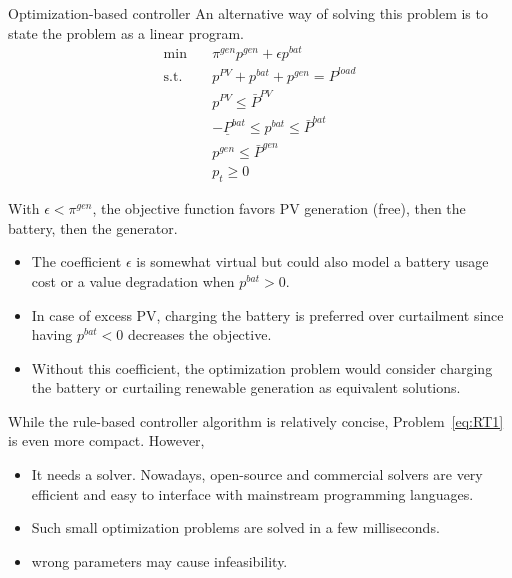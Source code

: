\begin{frame}[allowframebreaks]{Optimization-based controller}
An alternative way of solving this problem is to state the problem as a linear program. 
\begin{subequations}
	\label{eq:RT1}
    \begin{align}
    \min        \quad  & \pi^{gen} p^{gen}  + \epsilon p^{bat}\\
    \text{s.t.} \quad  & p^{PV}+p^{bat}+p^{gen} = P^{load} \\
                    & p^{PV} \leq \bar{P}^{PV} \\
                    & -\underline{P}^{bat} \leq p^{bat} \leq \bar{P}^{bat} \\
                    & p^{gen} \leq \bar{P}^{gen}\\
                    & p_t \geq 0
    \end{align}
\end{subequations}

With $\epsilon < \pi^{gen}$, the objective function favors PV generation (free), then the battery, then the generator. 

\begin{itemize}
    \item The coefficient $\epsilon$ is somewhat virtual but could also model a battery usage cost or a value degradation when $p^{bat} > 0$.
    \item In case of excess PV, charging the battery is preferred over curtailment since having $p^{bat} < 0$ decreases the objective. 
    \item Without this coefficient, the optimization problem would consider charging the battery or curtailing renewable generation as equivalent solutions.
\end{itemize}

While the rule-based controller algorithm is relatively concise, Problem~\eqref{eq:RT1} is even more compact. 
However,
\begin{itemize}
    \item It needs a solver. Nowadays, open-source and commercial solvers are very efficient and easy to interface with mainstream programming languages. 
    \item Such small optimization problems are solved in a few milliseconds. 
    \item wrong parameters may cause infeasibility. 
\end{itemize}
\end{frame}


